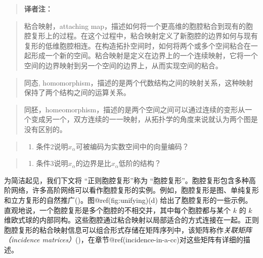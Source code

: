 \documentclass[
  12pt,
]{krantz}
\providecommand{\tightlist}{%
  \setlength{\itemsep}{0pt}\setlength{\parskip}{0pt}}
\begin{document}
\begin{glossarybox}

\begin{quote}
\textbf{译者注：}
\end{quote}

\begin{quote}
粘合映射，attaching
map，描述如何将一个更高维的胞腔粘合到现有的胞腔复形上的过程。在这个过程中，粘合映射定义了新胞腔的边界如何与现有复形的低维胞腔相连。在构造拓扑空间时，如何将两个或多个空间粘合在一起形成一个新的空间。粘合映射是定义在边界上的一个连续映射，它将一个空间的边界映射到另一个空间的边界上，从而实现空间的粘合。
\end{quote}

\begin{quote}
同态,
homomorphism，描述的是两个代数结构之间的映射关系，这种映射保持了两个结构之间的运算关系。
\end{quote}

\begin{quote}
同胚，homeomorphism，描述的是两个空间之间可以通过连续的变形从一个变成另一个，双方连续的一一映射，从拓扑学的角度来说就认为两个图是没有区别的。
\end{quote}

\begin{quote}
\begin{enumerate}
\def\labelenumi{\arabic{enumi}.}
\tightlist
\item
  条件2说明\(x_\alpha\)可被编码为实数空间中的向量编码？
\end{enumerate}
\end{quote}

\begin{quote}
\begin{enumerate}
\def\labelenumi{\arabic{enumi}.}
\setcounter{enumi}{1}
\tightlist
\item
  条件3说明\(x_\alpha\)的边界是比\(x_\alpha\)低阶的结构？
\end{enumerate}
\end{quote}

\end{glossarybox}

为简洁起见，我们下文将 ``正则胞腔复形''称为
``胞腔复形''。胞腔复形包含多种高阶网络，许多高阶网络可以看作胞腔复形的实例。例如，胞腔复形是图、单纯复形和立方复形的自然推广()。图@ref(fig:unifying)(d)
给出了胞腔复形的一些示例。直观地说，一个胞腔复形是多个胞腔的不相交并，其中每个胞腔都与某个
\(k\) 的
\(k\)维欧式球的内部同构。这些胞腔通过粘合映射以局部适合的方式连接在一起。正则胞腔复形的粘合映射信息可以组合形式存储在矩阵序列中，该矩阵称作\emph{关联矩阵（incidence
matrices）}()，在章节@ref(incidence-in-a-cc)对这些矩阵有详细的描述。
\end{document}

